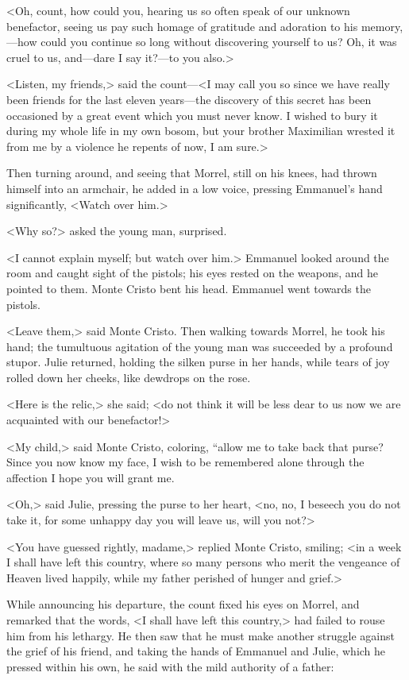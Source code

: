  <Oh, count, how could you, hearing us so often speak of our unknown benefactor, seeing us pay such homage of gratitude and adoration to his memory,—how could you continue so long without discovering yourself to us? Oh, it was cruel to us, and—dare I say it?—to you also.> 

 <Listen, my friends,> said the count—<I may call you so since we have really been friends for the last eleven years—the discovery of this secret has been occasioned by a great event which you must never know. I wished to bury it during my whole life in my own bosom, but your brother Maximilian wrested it from me by a violence he repents of now, I am sure.> 

 Then turning around, and seeing that Morrel, still on his knees, had thrown himself into an armchair, he added in a low voice, pressing Emmanuel's hand significantly, <Watch over him.> 

 <Why so?> asked the young man, surprised. 

 <I cannot explain myself; but watch over him.> Emmanuel looked around the room and caught sight of the pistols; his eyes rested on the weapons, and he pointed to them. Monte Cristo bent his head. Emmanuel went towards the pistols. 

 <Leave them,> said Monte Cristo. Then walking towards Morrel, he took his hand; the tumultuous agitation of the young man was succeeded by a profound stupor. Julie returned, holding the silken purse in her hands, while tears of joy rolled down her cheeks, like dewdrops on the rose. 

 <Here is the relic,> she said; <do not think it will be less dear to us now we are acquainted with our benefactor!> 

 <My child,> said Monte Cristo, coloring, “allow me to take back that purse? Since you now know my face, I wish to be remembered alone through the affection I hope you will grant me. 

 <Oh,> said Julie, pressing the purse to her heart, <no, no, I beseech you do not take it, for some unhappy day you will leave us, will you not?> 

 <You have guessed rightly, madame,> replied Monte Cristo, smiling; <in a week I shall have left this country, where so many persons who merit the vengeance of Heaven lived happily, while my father perished of hunger and grief.> 

 While announcing his departure, the count fixed his eyes on Morrel, and remarked that the words, <I shall have left this country,> had failed to rouse him from his lethargy. He then saw that he must make another struggle against the grief of his friend, and taking the hands of Emmanuel and Julie, which he pressed within his own, he said with the mild authority of a father: 

